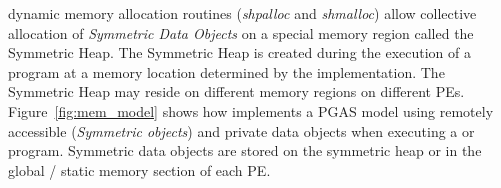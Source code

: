 \openshmem dynamic memory allocation routines (\textit{shpalloc} and \textit{shmalloc}) allow collective allocation of \emph{Symmetric
Data Objects} on a special memory region called the Symmetric Heap. The Symmetric Heap is created during the execution of a program at a memory location
determined by the implementation. The Symmetric Heap may reside on different memory regions on different \ac{PE}s. Figure~\ref{fig:mem_model} shows how \openshmem implements a \ac{PGAS} model using remotely accessible (\emph{Symmetric objects}) and private data objects when executing a \Clang{} or \Fortran{} program. Symmetric data objects are stored on the symmetric heap or 
in the global / static memory section of each \ac{PE}. 

     
